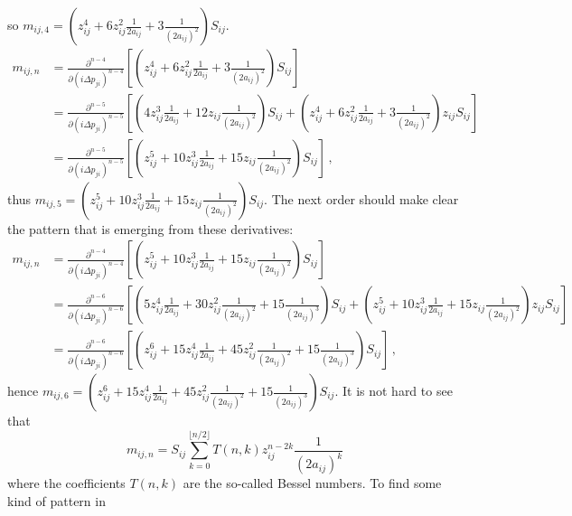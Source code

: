 \documentclass[a4paper, 11pt]{scrartcl}
\newcommand{\parenths}[1]{\left(#1\right)}
\newcommand{\sqbrackets}[1]{\left[#1\right]}
\begin{document}
so $m_{ij, 4} = \parenths{z^4_{ij} + 6 z_{ij}^2 \frac{1}{2 a_{ij}} + 3 \frac{1}{(2 a_{ij})^2}}  
S_{ij}$.  
\begin{align}
    \nonumber
    m_{ij, n} &= \frac{\partial^{n-4}}{\partial (i\Delta p_{ji})^{n-4}} 
    \sqbrackets{ \parenths{ z^4_{ij} + 6 z_{ij}^2 \frac{1}{2 a_{ij}} + 3 \frac{1}{(2 a_{ij})^2} }  S_{ij} }\\
    \nonumber
    &= \frac{\partial^{n-5}}{\partial (i\Delta p_{ji})^{n-5}} 
    \sqbrackets{ \parenths{4 z^3_{ij} \frac{1}{2 a_{ij}} + 12 z_{ij} \frac{1}{(2 a_{ij})^2} } S_{ij} 
    + \parenths{ z^4_{ij} + 6 z_{ij}^2 \frac{1}{2 a_{ij}} + 3 \frac{1}{(2 a_{ij})^2} } z_{ij} S_{ij}} \\ 
    &= \frac{\partial^{n-5}}{\partial (i\Delta p_{ji})^{n-5}} 
    \sqbrackets{ \parenths{z^5_{ij} + 10 z_{ij}^3 \frac{1}{2 a_{ij}} + 15 z_{ij} \frac{1}{(2 a_{ij})^2}}  S_{ij}}\,, 
\end{align}
thus  $m_{ij, 5} = \parenths{z^5_{ij} + 10 z_{ij}^3 \frac{1}{2 a_{ij}} + 15 z_{ij} 
\frac{1}{(2 a_{ij})^2}} S_{ij}$. The next order should make clear the pattern that is emerging from
these derivatives:
\begin{align}
    \nonumber
    m_{ij, n} &= \frac{\partial^{n-4}}{\partial (i\Delta p_{ji})^{n-4}} 
    \sqbrackets{ \parenths{z^5_{ij} + 10 z_{ij}^3 \frac{1}{2 a_{ij}} + 15 z_{ij} 
    \frac{1}{(2 a_{ij})^2}}  S_{ij} }\\
    \nonumber
    &= \frac{\partial^{n-6}}{\partial (i\Delta p_{ji})^{n-6}} 
    \sqbrackets{ \parenths{ 5 z^4_{ij} \frac{1}{2 a_{ij}} 
    + 30 z_{ij}^2 \frac{1}{(2 a_{ij})^2} + 15 \frac{1}{(2 a_{ij})^3}}
    S_{ij} + \parenths{z^5_{ij} + 10 z_{ij}^3 \frac{1}{2 a_{ij}} + 15 z_{ij} \frac{1}{(2 a_{ij})^2}} 
    z_{ij} S_{ij}} \\ 
    &= \frac{\partial^{n-6}}{\partial (i\Delta p_{ji})^{n-6}} 
    \sqbrackets{ \parenths{z^6_{ij} + 15 z_{ij}^4 \frac{1}{2 a_{ij}} 
    + 45 z_{ij}^2 \frac{1}{(2 a_{ij})^2} + 15 \frac{1}{(2 a_{ij})^3}}  S_{ij}}\,, 
\end{align}
hence $m_{ij, 6} = \parenths{z^6_{ij} + 15 z_{ij}^4 \frac{1}{2 a_{ij}} + 45 z_{ij}^2 \frac{1}{(2 
a_{ij})^2} + 15 \frac{1}{(2 a_{ij})^3}}  S_{ij}$. It is not hard to see that 
\begin{equation}
    m_{ij, n} = S_{ij} \sum_{k=0}^{\lfloor n/2 \rfloor} T(n, k) z_{ij}^{n-2k} \frac{1}{(2 a_{ij})^k} 
    \label{eq:moment}
\end{equation}
where the coefficients $T(n,k)$ are the so-called Bessel numbers. To find some kind of pattern in
\end{document}
